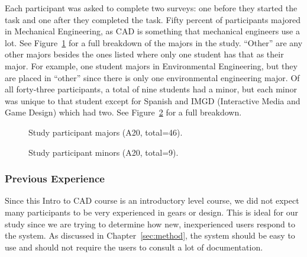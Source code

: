 \begin{doublespace}
Each participant was asked to complete two surveys: one before they started the task and one after they completed the task. Fifty percent of participants majored in Mechanical Engineering, as CAD is something that mechanical engineers use a lot. See Figure~\ref{fig:majors} for a full breakdown of the majors in the study. ``Other'' are any other majors besides the ones listed where only one student has that as their major. For example, one student majors in Environmental Engineering, but they are placed in ``other'' since there is only one environmental engineering major. Of all forty-three participants, a total of nine students had a minor, but each minor was unique to that student except for Spanish and IMGD (Interactive Media and Game Design) which had two. See Figure~\ref{fig:minors} for a full breakdown.

\begin{figure}
    \centering
    \caption{Study participant majors (A20, total=46).}
    \label{fig:majors}
\end{figure}

\begin{figure}
    \centering
    \caption{Study participant minors (A20, total=9).}
    \label{fig:minors}
\end{figure}

\subsubsection{Previous Experience}

Since this Intro to CAD course is an introductory level course, we did not expect many participants to be very experienced in gears or design. This is ideal for our study since we are trying to determine how new, inexperienced users respond to the system. As discussed in Chapter~\ref{sec:method}, the system should be easy to use and should not require the users to consult a lot of documentation.


\end{doublespace}
